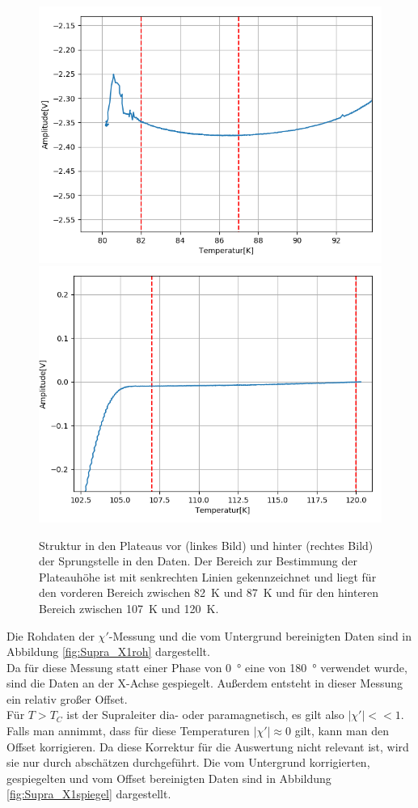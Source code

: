 \documentclass[12pt,a4paper]{article}
\begin{document}
\begin{figure}
\centering
\includegraphics[scale=0.5]{Bilder/Haupt_Supra/X1unten.png}
\includegraphics[scale=0.5]{Bilder/Haupt_Supra/X1oben.png}
\caption{Struktur in den Plateaus vor (linkes Bild) und hinter (rechtes Bild) der Sprungstelle in den Daten. Der Bereich zur Bestimmung der Plateauhöhe ist mit senkrechten Linien gekennzeichnet und liegt für den vorderen Bereich zwischen \SI{82}{K} und \SI{87}{K} und für den hinteren Bereich zwischen \SI{107}{K} und \SI{120}{K}.}
\label{fig:Supra_X1struct}
\end{figure}

Die Rohdaten der $\chi'$-Messung und die vom Untergrund bereinigten Daten sind in Abbildung \ref{fig:Supra_X1roh} dargestellt.\\
Da für diese Messung statt einer Phase von \SI{0}{\degree} eine von \SI{180}{\degree} verwendet wurde, sind die Daten an der X-Achse gespiegelt. Außerdem entsteht in dieser Messung ein relativ großer Offset.\\
Für $T>T_C$ ist der Supraleiter dia- oder paramagnetisch, es gilt also $|\chi'| << 1$. Falls man annimmt, dass für diese Temperaturen $|\chi'| \approx 0$ gilt, kann man den Offset korrigieren. Da diese Korrektur für die Auswertung nicht relevant ist, wird sie nur durch abschätzen durchgeführt.
Die vom Untergrund korrigierten, gespiegelten und vom Offset bereinigten Daten sind in Abbildung \ref{fig:Supra_X1spiegel} dargestellt. 
\end{document}
